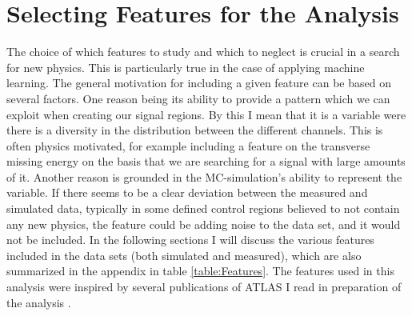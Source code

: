 \section{Selecting Features for the Analysis}\label{sec:Feats}
The choice of which features to study and which to neglect is crucial in a search for new physics. This is particularly true 
in the case of applying machine learning. The general motivation for including a given feature can be based on several factors. 
One reason being its ability to provide a pattern which we can exploit when creating our signal regions. By this I mean
that it is a variable were there is a diversity in the distribution between the different channels. This is often physics motivated, for example 
including a feature on the transverse missing energy on the basis that we are searching for a signal with large amounts of it. 
Another reason is grounded in the \ac{MC}-simulation's ability to represent the variable. If there seems to be a clear deviation between the 
measured and simulated data, typically in some defined control regions believed to not contain any new physics, the feature could be adding noise 
to the data set, and it would not be included. In the following sections I will discuss the various features included in the data sets (both simulated and measured), 
which are also summarized in the appendix in table \ref{table:Features}. The features used in this analysis were inspired by several publications of \ac{ATLAS} I read in 
preparation of the analysis \cite{franchini_search_2019, atlas_search_2021}.